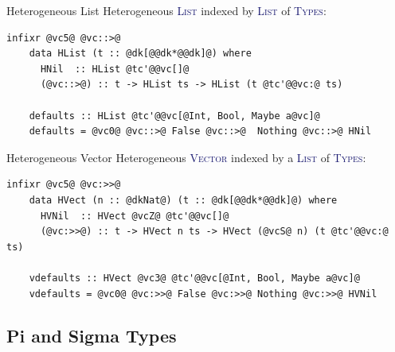 \documentclass[xcolor={usenames,dvipsnames}]{beamer}
\newcommand{\htycon}[1]{\textcolor{MidnightBlue}{\textsc{#1}}}
\begin{document}
\begin{frame}[fragile]{Heterogeneous List}
  Heterogeneous \htycon{List} indexed by \htycon{List} of \htycon{Types}:
  \begin{lstlisting}[style=hask]
    infixr @vc5@ @vc::>@
    data HList (t :: @dk[@@dk*@@dk]@) where
      HNil  :: HList @tc'@@vc[]@
      (@vc::>@) :: t -> HList ts -> HList (t @tc'@@vc:@ ts)

    defaults :: HList @tc'@@vc[@Int, Bool, Maybe a@vc]@
    defaults = @vc0@ @vc::>@ False @vc::>@  Nothing @vc::>@ HNil
  \end{lstlisting}
\end{frame}

\begin{frame}[fragile]{Heterogeneous Vector}
  Heterogeneous \htycon{Vector} indexed by a \htycon{List} of \htycon{Types}:
  \begin{lstlisting}[style=hask]
    infixr @vc5@ @vc:>>@
    data HVect (n :: @dkNat@) (t :: @dk[@@dk*@@dk]@) where
      HVNil  :: HVect @vcZ@ @tc'@@vc[]@
      (@vc:>>@) :: t -> HVect n ts -> HVect (@vcS@ n) (t @tc'@@vc:@ ts)

    vdefaults :: HVect @vc3@ @tc'@@vc[@Int, Bool, Maybe a@vc]@
    vdefaults = @vc0@ @vc:>>@ False @vc:>>@ Nothing @vc:>>@ HVNil
  \end{lstlisting}
\end{frame}

%


\subsection{Pi and Sigma Types}
\end{document}
